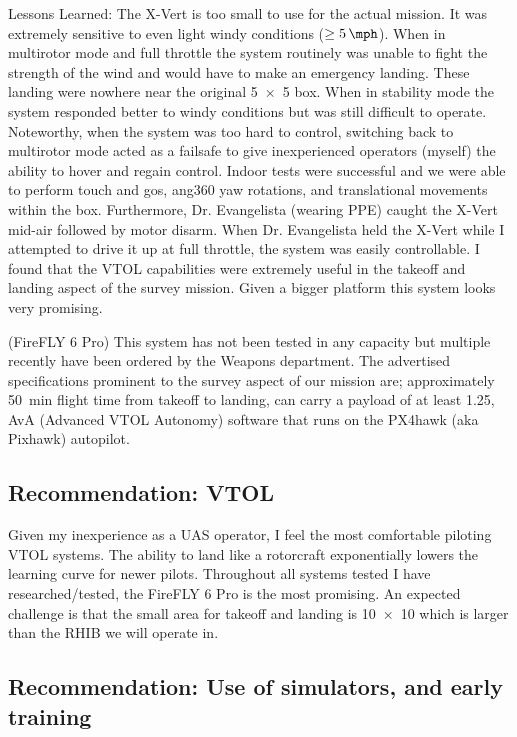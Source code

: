 Lessons Learned: The X-Vert is too small to use for the actual mission. It was extremely sensitive to even light windy conditions ($\geq\SI{5}{\mph}$). When in multirotor mode and full throttle the system routinely was unable to fight the strength of the wind and would have to make an emergency landing. These landing were nowhere near the original \SI{5x5}{\foot} box. When in stability mode the system responded better to windy conditions but was still difficult to operate. Noteworthy, when the system was too hard to control, switching back to multirotor mode acted as a failsafe to give inexperienced operators (myself) the ability to hover and regain control.  Indoor tests were successful and we were able to perform touch and gos, ang{360} yaw rotations, and translational movements within the box. Furthermore, Dr. Evangelista (wearing PPE) caught the X-Vert mid-air followed by motor disarm. When Dr. Evangelista held the X-Vert while I attempted to drive it up at full throttle, the system was easily controllable.  I found that the VTOL capabilities were extremely useful in the takeoff and landing aspect of the survey mission. Given a bigger platform this system looks very promising.

(FireFLY 6 Pro) This system has not been tested in any capacity but multiple recently have been ordered by the Weapons department. The advertised specifications prominent to the survey aspect of our mission are; approximately \SI{50}{\minute} flight time from takeoff to landing, can carry a payload of at least \SI{1.25}{\pound}, AvA (Advanced VTOL Autonomy) software that runs on the PX4hawk (aka Pixhawk) autopilot. 

\subsection{Recommendation: VTOL}

Given my inexperience as a UAS operator, I feel the most comfortable piloting VTOL systems. The ability to land like a rotorcraft exponentially lowers the learning curve for newer pilots. Throughout all systems tested I have researched/tested, the FireFLY 6 Pro is the most promising. An expected challenge is that the small area for takeoff and landing is \SI{10x10}{\foot} which is larger than the RHIB we will operate in. 


\subsection{Recommendation: Use of simulators, and early training}

